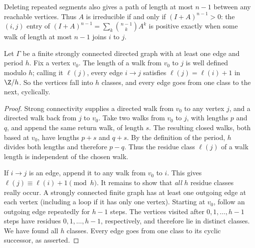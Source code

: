 Deleting repeated segments also gives a path of length at most $n-1$ between
any reachable vertices. Thus $A$ is irreducible if and only if $(I+A)^{n-1}>0$: the
$(i,j)$ entry of $(I+A)^{n-1}=\sum_k\binom{n-1}kA^k$ is positive exactly when some walk of length at most $n-1$ joins $i$ to $j$.

\begin{proposition}\label{linear:prop:levels}
Let $\Gamma$ be a finite strongly connected directed graph with at least one edge and period $h$. Fix a vertex $v_0$. The length of a walk from $v_0$ to $j$ is
well defined modulo $h$; calling it $\ell(j)$, every edge $i\to j$ satisfies $\ell(j)=\ell(i)+1$ in $\Z/h$. So the vertices
fall into $h$ classes, and every edge goes from one class to the next, cyclically.
\end{proposition}
\begin{proof}
Strong connectivity supplies a directed walk from
$v_0$ to any vertex $j$, and a directed walk
back from $j$ to $v_0$. Take two walks from
$v_0$ to $j$, with lengths $p$ and $q$, and
append the same return walk, of length $s$.
The resulting closed walks, both based at $v_0$,
have lengths $p+s$ and $q+s$.
By the definition of the period, $h$ divides
both lengths and therefore $p-q$. Thus the
residue class $\ell(j)$ of a walk length is
independent of the chosen walk.

If $i\to j$ is an edge, append it to any walk
from $v_0$ to $i$. This gives
$\ell(j)\equiv\ell(i)+1\pmod h$.
It remains to show that \emph{all} $h$ residue
classes really occur. A strongly connected
finite graph has at least one outgoing edge
at each vertex (including a loop if it has only
one vertex). Starting at $v_0$, follow an
outgoing edge repeatedly for $h-1$ steps.
The vertices visited after $0,1,\ldots,h-1$
steps have residues $0,1,\ldots,h-1$,
respectively, and therefore lie in distinct
classes. We have found all $h$ classes.
Every edge goes from one class to its cyclic
successor, as asserted.
\end{proof}

